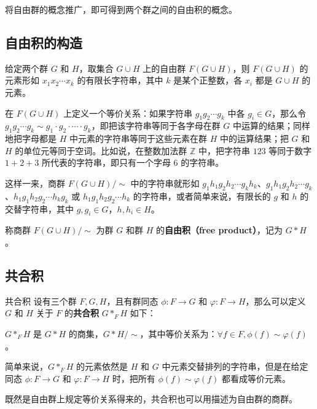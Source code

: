 
将自由群的概念推广，即可得到两个群之间的自由积的概念。

\subsection{自由积的构造}

给定两个群 $G$ 和 $H$，取集合 $G\cup H$ 上的自由群 $F(G\cup H)$，则 $F(G\cup H)$ 的元素形如 $x_1x_2\cdots x_k$ 的有限长字符串，其中 $k$ 是某个正整数，各 $x_i$ 都是 $G\cup H$ 的元素。

在 $F(G\cup H)$ 上定义一个等价关系：如果字符串 $g_1g_2\cdots g_k$ 中各 $g_i\in G$，那么令 $g_1g_2\cdots g_k\sim g_1\cdot g_2\cdot\cdots\cdot g_k$，即把该字符串等同于各字母在群 $G$ 中运算的结果；同样地把字母都是 $H$ 中元素的字符串等同于这些元素在群 $H$ 中的运算结果；把 $G$ 和 $H$ 的单位元等同于空词。比如说，在整数加法群 $\mathbb{Z}$ 中，把字符串 $123$ 等同于数字 $1+2+3$ 所代表的字符串，即只有一个字母 $6$ 的字符串。

这样一来，商群 $F(G\cup H)/\sim$ 中的字符串就形如 $g_1h_1g_2h_2\cdots g_kh_k$、$g_1h_1g_2h_2\cdots g_k$、$h_1g_1h_2g_2\cdots h_kg_k$ 或 $h_1g_1h_2g_2\cdots h_k$ 的字符串，或者简单来说，有限长的 $g$ 和 $h$ 的交替字符串，其中 $g, g_i\in G$，$h, h_i\in H$。

称商群 $F(G\cup H)/\sim$ 为群 $G$ 和群 $H$ 的\textbf{自由积（free product）}，记为 $G*H$。

\subsection{共合积}
\begin{definition}{共合积}
设有三个群 $F, G, H$，且有群同态 $\phi:F\rightarrow G$ 和 $\varphi:F\rightarrow H$，那么可以定义 $G$ 和 $H$ 关于 $F$ 的\textbf{共合积} $G*_FH$ 如下：

$G*_FH$ 是 $G*H$ 的商集，$G*H/\sim$，其中等价关系为：$\forall f\in F, \phi(f)\sim\varphi(f)$。
\end{definition}

简单来说，$G*_FH$ 的元素依然是 $H$ 和 $G$ 中元素交替排列的字符串，但是在给定同态 $\phi:F\rightarrow G$ 和 $\varphi:F\rightarrow H$ 时，把所有 $\phi(f)\sim\varphi(f)$ 都看成等价元素。




既然是自由群上规定等价关系得来的，共合积也可以用描述为自由群的商群。




